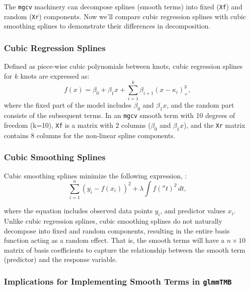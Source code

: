 \documentclass[12pt, twoside,hidelinks]{article}
\theoremstyle{definition}
\numberwithin{equation}{section}
\begin{document}
The \texttt{mgcv} machinery can decompose splines (smooth terms) into fixed (\texttt{Xf}) and random (\texttt{Xr}) components. Now we'll compare cubic regression splines with cubic smoothing splines to demonstrate their differences in decomposition.

\subsubsection{Cubic Regression Splines}\label{sec:smooth:dec:cr}

Defined as piece-wise cubic polynomials between knots, cubic regression splines for \(k\) knots are expressed as:
\begin{equation}
    f(x) = \beta_0 + \beta_1 x + \sum_{i=1}^{k} \beta_{i+1} (x - \kappa_i)^3_+,
    \label{eq:cr_splines}
\end{equation}
 where the fixed part of the model includes \(\beta_0\) and \(\beta_1 x\), and the random part consists of the subsequent terms. In an \texttt{mgcv} smooth term with 10 degrees of freedom (k=10), \texttt{Xf} is a 
matrix with 2 columns (\(\beta_0\) and \(\beta_1 x\)), and the \texttt{Xr} matrix contains 8 columns for the non-linear spline components.

\subsubsection{Cubic Smoothing Splines}\label{sec:smooth:dec:cs}

Cubic smoothing splines minimize the following expression, \citet[p~151]{hastie}:
\begin{equation}
\sum_{i=1}^{n} (y_i - f(x_i))^2 + \lambda \int { f(''t)^2} \, dt,
\label{eq:smoothing_splines}
\end{equation}

where the equation includes observed data points \(y_i\), and predictor values \(x_i\). Unlike cubic regression splines, cubic smoothing splines do not naturally decompose into fixed and random components, resulting in the entire basis function acting as a random effect. That is, the smooth terms will have a \(n \times 10\) matrix of basis coefficients to capture the relationship between the smooth term (predictor) and the response variable. 

\subsubsection{Implications for Implementing Smooth Terms in \texttt{glmmTMB}}\label{sec:smooth:dec:implic}
\end{document}
